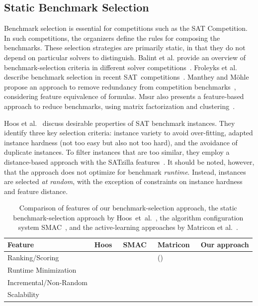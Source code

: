 \documentclass[sn-basic, Numbered]{sn-jnl} %
\newcommand{\cmark}{\ding{51}} %
\newcommand{\xmark}{\ding{55}}
\begin{document}
\subsection{Static Benchmark Selection}
\label{sec:related:static-selection}

Benchmark selection is essential for competitions such as the SAT Competition.
In such competitions, the organizers define the rules for composing the benchmarks.
These selection strategies are primarily static, in that they do not depend on particular solvers to distinguish.
Balint et al. provide an overview of benchmark-selection criteria in different solver competitions~\cite{balint2015overview}.
Froleyks et al. describe benchmark selection in recent SAT~competitions~\cite{FroleyksHIJS21}.
Manthey and Möhle propose an approach to remove redundancy from competition benchmarks~\cite{manthey2016better}, considering feature equivalence of formulas.
M{\i}s{\i}r also presents a feature-based approach to reduce benchmarks, using matrix factorization and clustering~\cite{misir2021benchmark}.

Hoos et al.~\cite{HoosKSS13} discuss desirable properties of SAT benchmark instances.
They identify three key selection criteria: instance variety to avoid over-fitting, adapted instance hardness (not too easy but also not too hard), and the avoidance of duplicate instances. 
To filter instances that are too similar, they employ a distance-based approach with the SATzilla features~\cite{XuHHL08,features}.
It should be noted, however, that the approach does not optimize for benchmark \emph{runtime}.
Instead, instances are selected \emph{at random}, with the exception of constraints on instance hardness and feature distance.

\begin{table}[tbp]
  \centering
  \caption{Comparison of features of our benchmark-selection approach, the static benchmark-selection approach by Hoos~et~al.~\cite{HoosKSS13}, the algorithm configuration system SMAC~\cite{HutterHL11}, and the active-learning approaches by Matricon et al.~\cite{MatriconAFSH21}.
  }
  \label{tab:requirements}
  \begin{tabular}{
    m{}
    >{\centering\arraybackslash}m{}
    >{\centering\arraybackslash}m{}
    >{\centering\arraybackslash}m{}
    >{\centering\arraybackslash}m{}
  }
    \toprule
    Feature & Hoos~\cite{HoosKSS13} & SMAC~\cite{HutterHL11} & Matricon~\cite{MatriconAFSH21} & Our approach \\
    \midrule
    Ranking/Scoring & \cmark & \xmark & (\cmark) & \cmark \\
    Runtime Minimization & \xmark & \cmark & \cmark & \cmark \\
    Incremental/Non-Random & \xmark & \xmark & \cmark & \cmark \\
    Scalability & \cmark & \cmark & \xmark & \cmark \\
    \bottomrule
  \end{tabular}
\end{table}
\end{document}
